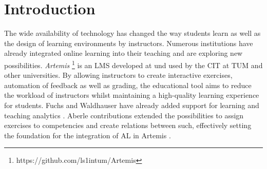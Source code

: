\documentclass[a4paper,12pt,twoside]{article}
\begin{document}
\setlength{\evensidemargin}{22pt}
\setlength{\oddsidemargin}{22pt}



\lstset{showspaces=false, numbers=left, frame=single, basicstyle=\small}




\fancyhead{}
\pagestyle{fancy}
\fancyhead[LE]{\slshape \leftmark}
\fancyhead[RO]{\slshape \rightmark}
\headheight=15pt

\section{Introduction}

The wide availability of technology has changed the way students learn as well as the design of learning environments by instructors. Numerous
institutions have already integrated online learning into their teaching and are exploring new possibilities. \textit{Artemis}
\footnote{https://github.com/ls1intum/Artemis} is an \ac{LMS} developed at und used by the \ac{CIT} at \ac{TUM} and other universities.
By allowing instructors to create interactive exercises, automation of feedback as well as grading, the educational tool aims to reduce the
workload of instructors whilst maintaining a high-quality learning experience for students. Fuchs and Waldhauser have already added support
for learning and teaching analytics \cite{fuchs2021,waldhauser2021}. Aberle contributions extended the possibilities to assign exercises to competencies and create relations
between such, effectively setting the foundation for the integration of \ac{AL} in Artemis \cite{aberle2022}.

\end{document}
